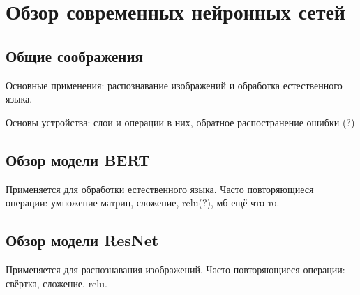 \section{Обзор современных нейронных сетей}
\label{sec:Chapter2} 

\subsection{Общие соображения}

Основные применения: распознавание изображений и обработка естественного языка.

Основы устройства: слои и операции в них, обратное распостранение ошибки (?)

\subsection{Обзор модели BERT}

Применяется для обработки естественного языка. Часто повторяющиеся операции:
умножение матриц, сложение, relu(?), мб ещё что-то.

\subsection{Обзор модели ResNet}

Применяется для распознавания изображений. Часто повторяющиеся операции:
свёртка, сложение, relu.

\newpage
